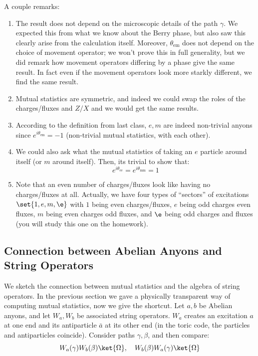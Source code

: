 A couple remarks:
\begin{enumerate}
    \item The result does not depend on the microscopic details of the path $\gamma$. We expected this from what we know about the Berry phase, but also saw this clearly arise from the calculation itself. Moreover, $\theta_{\text{em}}$ does not depend on the choice of movement operator; we won't prove this in full generality, but we did remark how movement operators differing by a phase give the same result. In fact even if the movement operators look more starkly different, we find the same result.
    \item Mutual statistics are symmetric, and indeed we could swap the roles of the charges/fluxes and $Z/X$ and we would get the same results.
    \item According to the definition from last class, $e, m$ are indeed non-trivial anyons since $e^{i\theta_{\text{em}}} = -1$ (non-trivial mutual statistics, with each other).
    \item We could also ask what the mutual statistics of taking an $e$ particle around itself (or $m$ around itself). Then, its trivial to show that:
    \begin{equation}
        e^{i\theta_{\text{ee}}} = e^{i\theta_{\text{mm}}} = 1
    \end{equation}
    \item Note that an even number of charges/fluxes look like having no charges/fluxes at all. Actually, we have four types of ``sectors'' of excitations $\set{1, e, m, \e}$ with $1$ being even charges/fluxes, $e$ being odd charges even fluxes, $m$ being even charges odd fluxes, and $\e$ being odd charges and fluxes (you will study this one on the homework).
\end{enumerate}

\subsection{Connection between Abelian Anyons and String Operators}
We sketch the connection between mutual statistics and the algebra of string operators. In the previous section we gave a physically transparent way of computing mutual statistics, now we give the shortcut. Let $a, b$ be Abelian anyons, and let $W_a, W_b$ be associated string operators. $W_a$ creates an excitation $a$ at one end and its antiparticle $\bar{a}$ at its other end (in the toric code, the particles and antiparticles coincide). Consider paths $\gamma, \beta$, and then compare:
\begin{equation}
    W_a(\gamma)W_b(\beta)\ket{\Omega}, \quad  W_b(\beta)W_a(\gamma)\ket{\Omega}
\end{equation}

